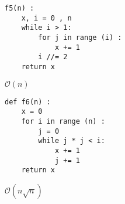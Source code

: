 \begin{lstlisting}
f5(n) :
    x, i = 0 , n
    while i > 1:
        for j in range (i) :
            x += 1
        i //= 2
    return x
\end{lstlisting}
\ifprof
$\mathcal{O}( n)$
\else
\fi



\begin{lstlisting}
def f6(n) :
    x = 0
    for i in range (n) :
        j = 0
        while j * j < i:
            x += 1
            j += 1
    return x
\end{lstlisting}
\ifprof
$\mathcal{O}( n\sqrt{n})$
\else

\fi


